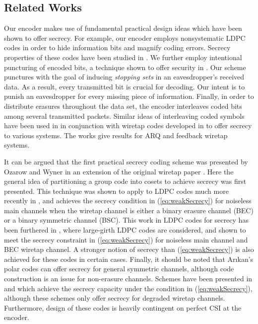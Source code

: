 \documentclass[10pt,twocolumn,twoside]{IEEEtran} \newlength{\pic}
\theoremstyle{definition}
\theoremstyle{remark}
\theoremstyle{plain}
\begin{document}
\subsection{Related Works}

Our encoder makes use of fundamental practical design ideas which have been shown to offer secrecy. For example, our encoder employs nonsystematic LDPC codes in order to hide information bits and magnify coding errors. Secrecy properties of these codes have been studied in \cite{Baldi10}. We further employ intentional puncturing of encoded bits, a technique shown to offer security in \cite{KlincITW09, Klinc09GC}. Our scheme punctures with the goal of inducing \emph{stopping sets} in an eavesdropper's received data. As a result, every transmitted bit is crucial for decoding. Our intent is to punish an eavesdropper for every missing piece of information. Finally, in order to distribute erasures throughout the data set, the encoder interleaves coded bits among several transmitted packets. Similar ideas of interleaving coded symbols have been used in \cite{Bloch08, MANETISIT09} in conjunction with wiretap codes developed in \cite{Thangaraj07} to offer secrecy to various systems. The works \cite{Lai08, Latif09} give results for ARQ and feedback wiretap systems.

It can be argued that the first practical secrecy coding scheme was presented by Ozarow and Wyner in an extension of the original wiretap paper \cite{Wyner84}. Here the general idea of partitioning a group code into cosets to achieve secrecy was first presented. This technique was shown to apply to LDPC codes much more recently in \cite{Thangaraj07}, and achieves the secrecy condition in (\ref{eq:weakSecrecy}) for noiseless main channels when the wiretap channel is either a binary erasure channel (BEC) or a binary symmetric channel (BSC). This work in LDPC codes for secrecy has been furthered in \cite{Arun10_ITW}, where large-girth LDPC codes are considered, and shown to meet the secrecy constraint in (\ref{eq:weakSecrecy}) for noiseless main channel and BEC wiretap channel. A stronger notion of secrecy than (\ref{eq:weakSecrecy}) is also achieved for these codes in certain cases. Finally, it should be noted that Ar{\i}kan's polar codes \cite{Arikan09} can offer secrecy for general symmetric channels, although code construction is an issue for non-erasure channels. Schemes have been presented in \cite{Hof10} and \cite{Mahdavifar10} which achieve the secrecy capacity under the condition in (\ref{eq:weakSecrecy}), although these schemes only offer secrecy for degraded wiretap channels. Furthermore, design of these codes is heavily contingent on perfect CSI at the encoder.
\end{document}
